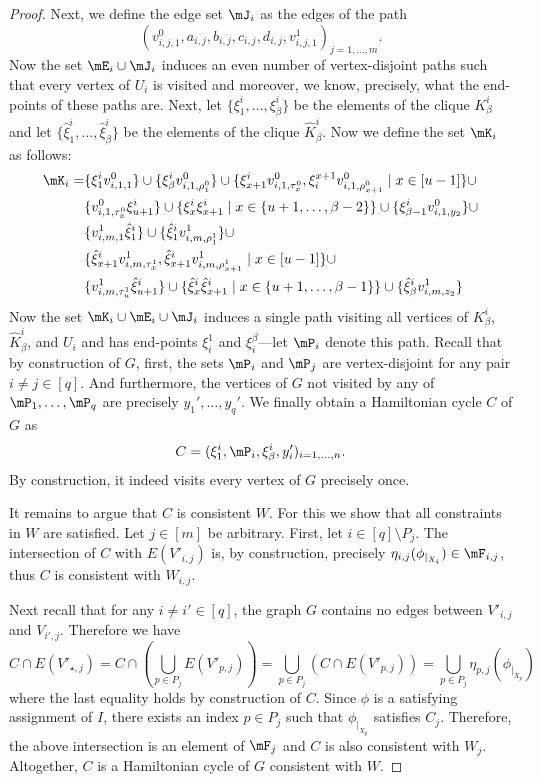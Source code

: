 \documentclass[a4paper,UKenglish,cleveref, autoref, thm-restate]{lipics-v2021}
\begin{document}
\begin{proof}
	Next, we define the edge set $\mJ_i$ as the edges of the path
	\[
		(v_{i,j,1}^0, a_{i,j}, b_{i,j}, c_{i,j}, d_{i,j}, v_{i,j,1}^1)_{j = 1, \dots, m}.
	\]
	Now the set $\mE_i \cup \mJ_i$ induces an even number of vertex-disjoint paths such that every vertex of $U_i$ is visited and moreover, we know, precisely, what the end-points of these paths are.
	Next, let $\{\xi^i_1, \dots, \xi^i_\beta\}$ be the elements of the clique $K_\beta^i$ and let $\{\hat\xi^i_1, \dots, \hat\xi^i_\beta\}$ be the elements of the clique $\hat K_\beta^i$.
	Now we define the set $\mK_i$ as follows:
	\begin{align*}
		\mK_i = &\{\xi^i_1 v^0_{i,1,1}\} \cup 
		\{\xi^i_\beta v_{i,1,\rho_1^0}^0\} \cup
		\{\xi^i_{x+1} v_{i,1,\tau_x^0}^0, \xi_i^{x+1}v_{i,1,\rho_{x+1}^0}^0 \mid x \in [u-1]\} \cup \\ 
		&\{v_{i,1,\tau_x^0}^0 \xi^i_{u+1}\} \cup 
		\{\xi^i_x \xi^i_{x+1} \mid x \in \{u+1, \dots, \beta-2\}\} \cup 
		\{\xi^i_{\beta-1} v_{i,1,y_2}^0\} \cup \\
		&\{v_{i,m,1}^1 \hat\xi^i_1\} \cup \{\hat\xi^i_1 v_{i,m,\rho_1^1}^1\} \cup \\
		&\{\hat\xi^i_{x+1} v_{i,m,\tau_{x}^1}^1, \hat \xi^i_{x+1} v_{i,m,\rho_{x+1}^1}^1 \mid x \in [u-1]\} \cup\\
		&\{v_{i,m,\tau_u^1}^1 \hat \xi^i_{u+1}\} \cup 
		\{\hat\xi^i_{x} \hat\xi^i_{x+1} \mid x \in \{u+1, \dots, \beta-1\}\} \cup 
		\{\hat\xi^i_\beta v_{i,m,z_2}^1\}
	\end{align*}
	Now the set $\mK_i \cup \mE_i \cup \mJ_i$ induces a single path visiting all vertices of $K_\beta^i$, $\hat K_\beta^i$, and $U_i$ and has end-points $\xi_i^1$ and $\xi_i^\beta$---let $\mP_i$ denote this path.
	Recall that by construction of $G$, first, the sets $\mP_i$ and $\mP_j$ are vertex-disjoint for any pair $i \neq j \in [q]$.
	And furthermore, the vertices of $G$ not visited by any of $\mP_1, \dots, \mP_q$ are precisely $y_1', \dots, y_q'$.
	We finally obtain a Hamiltonian cycle $C$ of $G$ as
	\[
		C = (\xi_1^i, \mP_i, \xi_\beta^i, y_i')_{i = 1, \dots, n}.
	\]
	By construction, it indeed visits every vertex of $G$ precisely once.
	
	It remains to argue that $C$ is consistent $W$.
	For this we show that all constraints in $W$ are satisfied.
	Let $j \in [m]$ be arbitrary.
	First, let $i \in [q] \setminus P_j$. 
	The intersection of $C$ with $E(V'_{i,j})$ is, by construction, precisely $\eta_{i,j}(\phi_{|_{X_i}}) \in \mF_{i,j}$, thus $C$ is consistent with $W_{i,j}$.

	Next recall that for any $i \neq i' \in [q]$, the graph $G$ contains no edges between $V'_{i,j}$ and $V_{i',j}$.
	Therefore we have
	\[
		C \cap E(V'_{\star, j}) = C \cap (\bigcup_{p \in P_j} E(V'_{p,j})) = \bigcup_{p \in P_j} (C \cap E(V'_{p, j})) = \bigcup_{p \in P_j} \eta_{p, j}(\phi_{|_{X_p}})
	\]
	where the last equality holds by construction of $C$.
	Since $\phi$ is a satisfying assignment of $I$, there exists an index $p \in P_j$ such that $\phi_{|_{X_p}}$ satisfies $C_j$.
	Therefore, the above intersection is an element of $\mF_j$ and $C$ is also consistent with $W_j$.
	Altogether, $C$ is a Hamiltonian cycle of $G$ consistent with $W$.
\end{proof}
\end{document}
